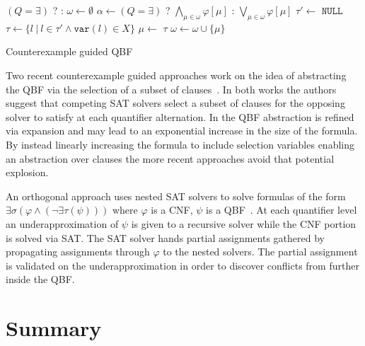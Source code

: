 \begin{algorithm}
    \begin{algorithmic}[1]
            \State \Return $(Q = \exists)$ ?  : 
        \EndIf
        \State $\omega \gets \emptyset$
        \Loop
        \State $\alpha \gets (Q = \exists)$ ? $\bigwedge_{\mu \in \omega} \varphi[\mu]$ : $\bigvee_{\mu \in \omega} \varphi[\mu]$
        \State $\tau' \gets$ 
         \Return $\texttt{NULL}$ \EndIIf
        \State $\tau \gets \{ l\ |\ l \in \tau' \land \texttt{var}(l) \in X \}$
        \State $\mu \gets $ 
         \Return $\tau$ \EndIIf
        \State $\omega \gets \omega \cup \{ \mu \}$
        \EndLoop
        \EndFunction
    \end{algorithmic}
    \caption{Counterexample guided QBF}
    \label{alg:rareqs}
\end{algorithm}

Two recent counterexample guided approaches work on the idea of abstracting the QBF via the selection of a subset of clauses~\cite{Rabe15,Janota15}. In both works the authors suggest that competing SAT solvers select a subset of clauses for the opposing solver to satisfy at each quantifier alternation. In \cite{Janota12} the QBF abstraction is refined via expansion and may lead to an exponential increase in the size of the formula. By instead linearly increasing the formula to include selection variables enabling an abstraction over clauses the more recent approaches avoid that potential explosion.

An orthogonal approach uses nested SAT solvers to solve formulas of the form $\exists \sigma (\varphi \land (\lnot \exists \tau (\psi)))$ where $\varphi$ is a CNF, $\psi$ is a QBF~\cite{Bogaerts16}. At each quantifier level an underapproximation of $\psi$ is given to a recursive solver while the CNF portion is solved via SAT. The SAT solver hands partial assignments gathered by propagating assignments through $\varphi$ to the nested solvers. The partial assignment is validated on the underapproximation in order to discover conflicts from further inside the QBF. 

\section{Summary}

